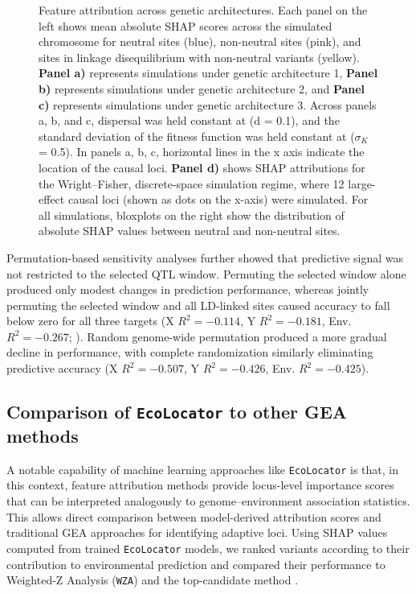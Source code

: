\documentclass[]{article}
\newcommand{\ecolocator}{\texttt{EcoLocator}\xspace}
\begin{document}
\begin{figure}[H]
    \caption{Feature attribution across genetic architectures. Each panel on the left shows
    mean absolute SHAP scores across the simulated chromosome for neutral sites 
    (blue), non-neutral sites (pink), and sites in linkage disequilibrium with
    non-neutral variants (yellow). \textbf{Panel a)} represents simulations under
    genetic architecture 1, \textbf{Panel b)} represents simulations under
    genetic architecture 2, and \textbf{Panel c)} represents simulations under
    genetic architecture 3. Across panels a, b, and c, dispersal was held constant
    at (d = 0.1), and the standard deviation of the fitness function was held
    constant at (\(\sigma_K\) = 0.5). 
    In panels a, b, c, horizontal lines in the
    x axis indicate the location of the causal loci.
    \textbf{Panel d)} shows SHAP attributions
    for the Wright--Fisher, discrete-space simulation regime, where 12
    large-effect causal loci (shown as dots on the x-axis) were simulated.
    For all simulations, bloxplots on the right show the distribution of
    absolute SHAP values between neutral and non-neutral sites.}

    \label{fig:shap-attribution}
\end{figure}

Permutation-based sensitivity analyses further showed that predictive signal was 
not restricted to the selected QTL window. Permuting the selected window alone 
produced only modest changes in prediction performance, whereas jointly permuting 
the selected window and all LD-linked sites caused accuracy to fall below zero for 
all three targets (X $R^2=-0.114$, Y $R^2=-0.181$, Env. $R^2=-0.267$; 
). Random genome-wide permutation produced a more 
gradual decline in performance, with complete randomization similarly 
eliminating predictive accuracy (X $R^2=-0.507$, Y $R^2=-0.426$, Env. $R^2=-0.425$).


\subsection{Comparison of \ecolocator to other GEA methods}

A notable capability of machine learning approaches like \ecolocator is that,
in this context,
feature attribution methods provide locus-level importance scores
that can be interpreted analogously to genome--environment association statistics.
This allows direct comparison between model-derived attribution scores
and traditional GEA approaches for identifying adaptive loci.
Using SHAP values computed from trained \ecolocator models,
we ranked variants according to their contribution to environmental prediction
and compared their performance to Weighted-Z Analysis (\texttt{WZA})
\citep{booker_wza_2024}
and the top-candidate method \citep{yeaman_convergent_2016}.
\end{document}
